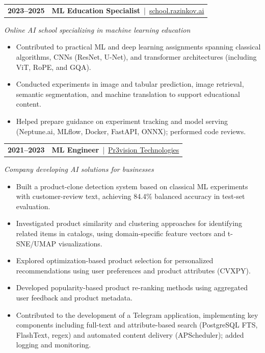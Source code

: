 \documentclass[12pt]{article}
\begin{document}
\vspace{4pt}
\begin{tabularx}{\textwidth}{@{}l X@{}}
\textbf{2023--2025} & \textbf{ML Education Specialist} \,|\, \href{https://school.razinkov.ai/}{school.razinkov.ai}
\end{tabularx}
\vspace{1pt}
\textit{Online AI school specializing in machine learning education}
\begin{itemize}
  \item Contributed to practical ML and deep learning assignments spanning classical algorithms, CNNs (ResNet, U-Net), and transformer architectures (including ViT, RoPE, and GQA).
  \item Conducted experiments in image and tabular prediction, image retrieval, semantic segmentation, and machine translation to support educational content.
  \item Helped prepare guidance on experiment tracking and model serving (Neptune.ai, MLflow, Docker, FastAPI, ONNX); performed code reviews.
\end{itemize}
\vspace{2pt}

\vspace{4pt}
\begin{tabularx}{\textwidth}{@{}l X@{}}
\textbf{2021--2023} & \textbf{ML Engineer} \,|\, \href{https://pr3vision.com/}{Pr3vision Technologies}
\end{tabularx}
\vspace{1pt}
\textit{Company developing AI solutions for businesses}
\begin{itemize}
  \item Built a product-clone detection system based on classical ML experiments with customer-review text, achieving 84.4\% balanced accuracy in test-set evaluation.
  \item Investigated product similarity and clustering approaches for identifying related items in catalogs, using domain-specific feature vectors and t-SNE/UMAP visualizations.
  \item Explored optimization-based product selection for personalized recommendations using user preferences and product attributes (CVXPY).
  \item Developed popularity-based product re-ranking methods using aggregated user feedback and product metadata.
  \item Contributed to the development of a Telegram application, implementing key components including full-text and attribute-based search (PostgreSQL FTS, FlashText, regex) and automated content delivery (APScheduler); added logging and monitoring.
\end{itemize}
\end{document}
